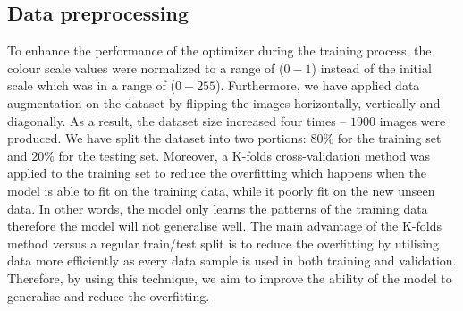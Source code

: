 \subsection{Data preprocessing}
To enhance the performance of the optimizer during the training process, the colour scale values were normalized to a range of (\(0-1\)) instead of the initial scale which was in a range of (\(0 - 255\)).	
Furthermore, we have applied data augmentation on the dataset by flipping the images horizontally, vertically and diagonally. 
As a result, the dataset size increased four times -- \(1900\)  images were produced.
We have split the dataset into two portions:  \(80\%\) for the training set and \(20\%\) for the testing set.
Moreover, a K-folds cross-validation method was applied to the training set to reduce the overfitting which happens when the model is able to fit on the training data, while it poorly fit on the new unseen data.
In other words, the model only learns the patterns of the training data therefore the model will not generalise well. 
The main advantage of the K-folds method versus a regular train/test split is to reduce the overfitting by utilising data more efficiently as every data sample is used in both training and validation. 
Therefore, by using this technique, we aim to improve the ability of the model to generalise and reduce the overfitting.
